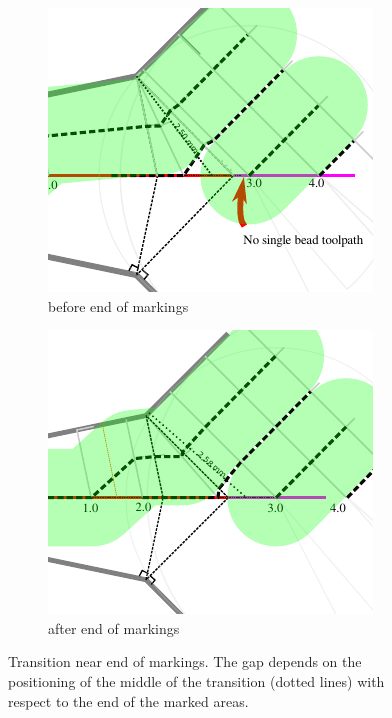 \begin{figure}
\begin{subfigure}{0.45\columnwidth}
\includegraphics[width=\columnwidth]{sources/method/change_to_marked.pdf}
\caption{before end of markings}
\end{subfigure}
\begin{subfigure}{0.45\columnwidth}
\includegraphics[width=\columnwidth]{sources/method/change_to_marked_2.pdf}
\caption{after end of markings}
\end{subfigure}
\caption{Transition near end of markings. The gap depends on the positioning of the middle of the transition (dotted lines) with respect to the end of the marked areas.}
\label{change_to_marked}
\end{figure}


